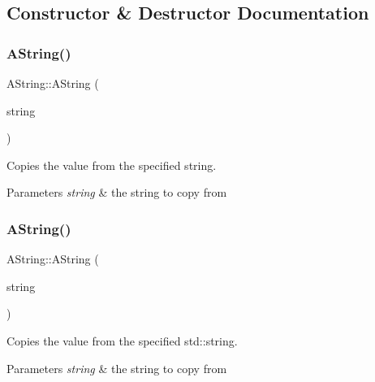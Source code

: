 \subsection{Constructor \& Destructor Documentation}
\mbox{\label{class_a_string_a0d8d5ba424e88b1a4b466c63f9d32d6d}} 
\subsubsection{\texorpdfstring{AString()}{AString()}\hspace{0.1cm}{\footnotesize\ttfamily [1/3]}}
{\footnotesize\ttfamily A\+String\+::\+A\+String (\begin{DoxyParamCaption}\item[{const \mbox{\hyperlink{class_a_string}{A\+String}} \&}]{string }\end{DoxyParamCaption})}



Copies the value from the specified string. 


\begin{DoxyParams}{Parameters}
{\em string} & the string to copy from \\
\hline
\end{DoxyParams}
\mbox{\label{class_a_string_a97a4d0d44621ca901455777c857f9032}} 
\subsubsection{\texorpdfstring{AString()}{AString()}\hspace{0.1cm}{\footnotesize\ttfamily [2/3]}}
{\footnotesize\ttfamily A\+String\+::\+A\+String (\begin{DoxyParamCaption}\item[{const std\+::string \&}]{string }\end{DoxyParamCaption})}



Copies the value from the specified std\+::string. 


\begin{DoxyParams}{Parameters}
{\em string} & the string to copy from \\
\hline
\end{DoxyParams}
\mbox{\label{class_a_string_a2cf05e679f64fb2d5e6e4154d6f7abcd}} 
